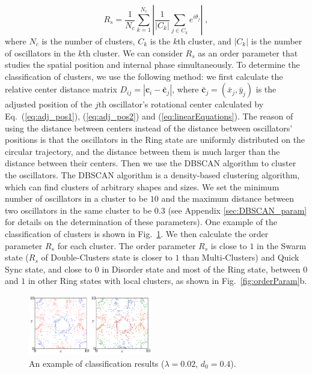 \documentclass[%
 aip,
 amsmath,amssymb,
 reprint,%
]{revtex4-1}
\begin{document}
\begin{equation}
    R_s=\frac{1}{N_c}\sum_{k=1}^{N_c}{\left| \frac{1}{\left| C_k \right|}\sum_{j\in C_k}{e^{i\theta _j}} \right|}\;,
\end{equation}
where $N_c$ is the number of clusters, $C_k$ is the $k$th cluster, and $\left| C_k \right|$ is the number of oscillators in the $k$th cluster. We can consider $R_s$ as an order parameter that studies the spatial position and internal phase simultaneously.
To determine the classification of clusters, we use the following method: we first calculate the relative center distance matrix $D_{ij}=\left| \mathbf{c}_i-\bar{\mathbf{c}}_j \right|$, where $\bar{\mathbf{c}}_j=\left( \bar{x}_j,\bar{y}_j \right)$ is the adjusted position of the $j$th oscillator's rotational center calculated by Eq.~(\ref{eq:adj_pos1}), (\ref{eq:adj_pos2}) and (\ref{eq:linearEquations}). 
The reason of using the distance between centers instead of the distance between oscillators' positions is that the oscillators in the Ring state are uniformly distributed on the circular trajectory, and the distance between them is much larger than the distance between their centers.
Then we use the DBSCAN algorithm to cluster the oscillators. The DBSCAN algorithm is a density-based clustering algorithm, which can find clusters of arbitrary shapes and sizes. We set the minimum number of oscillators in a cluster to be $10$ and the maximum distance between two oscillators in the same cluster to be $0.3$ (see Appendix \ref{sec:DBSCAN_param} for details on the determination of these parameters). 
One example of the classification of clusters is shown in Fig.~\ref{fig:classifyResult}.
We then calculate the order parameter $R_s$ for each cluster. The order parameter $R_s$ is close to $1$ in the Swarm state ($R_s$ of Double-Clusters state is closer to $1$ than Multi-Clusters) and Quick Sync state, and close to $0$ in Disorder state and most of the Ring state, between $0$ and $1$ in other Ring states with local clusters, as shown in Fig.~\ref{fig:orderParam}b.

\begin{figure}[b]
    \includegraphics[width=0.48\textwidth]{./figs/classifyResult.pdf}
    \caption{
        \label{fig:classifyResult} An example of classification results ($\lambda=0.02$, $d_0=0.4$).
    }
\end{figure}
\end{document}
